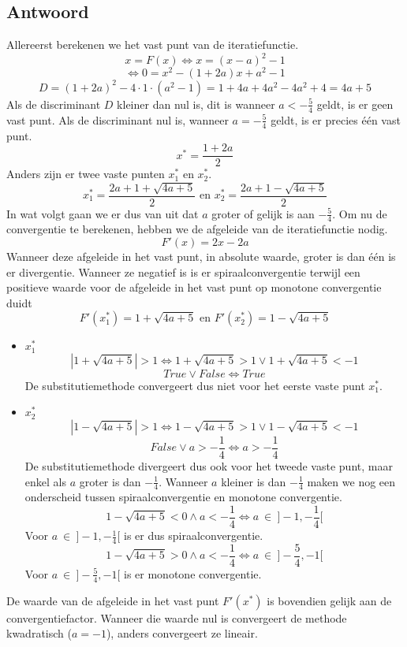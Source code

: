 \documentclass[examenvragen.tex]{subfiles}
\begin{document}
\subsection{Antwoord}
Allereerst berekenen we het vast punt van de iteratiefunctie.
\[
x = F(x) \Leftrightarrow x = (x-a)^2-1
\]
\[
\Leftrightarrow 0 = x^2-(1+2a)x+a^2-1
\]
\[
D = (1+2a)^2 - 4\cdot1\cdot(a^2-1) = 1+4a+4a^2-4a^2+4 = 4a+5
\]
Als de discriminant $D$ kleiner dan nul is, dit is wanneer $a < - \frac{5}{4}$ geldt, is er geen vast punt. Als de discriminant nul is, wanneer $a=-\frac{5}{4}$ geldt, is er precies \'e\'en vast punt. 
\[
x^{*} = \frac{1+2a}{2}
\]
Anders zijn er twee vaste punten $x^{*}_{1}$ en $x^{*}_{2}$.
\[
x^{*}_1 = \frac{2a+1 +\sqrt{4a+5}}{2} \text{ en } x^{*}_{2}= \frac{2a+1 -\sqrt{4a+5}}{2}
\]
In wat volgt gaan we er dus van uit dat $a$ groter of gelijk is aan $-\frac{5}{4}$.
Om nu de convergentie te berekenen, hebben we de afgeleide van de iteratiefunctie nodig.
\[
F'(x) = 2x-2a
\]
Wanneer deze afgeleide in het vast punt, in absolute waarde, groter is dan \'e\'en is er divergentie. Wanneer ze negatief is is er spiraalconvergentie terwijl een positieve waarde voor de afgeleide in het vast punt op monotone convergentie duidt
\[
F'(x^{*}_1) = 1 +  \sqrt{4a+5} \text{ en } F'(x^{*}_2) = 1-\sqrt{4a+5}
\]
\begin{itemize}
\item $x_{1}^{*}$
\[
|1 + \sqrt{4a+5}| > 1 \Leftrightarrow 1 + \sqrt{4a+5} > 1 \vee  1 + \sqrt{4a+5} < -1
\]
\[
True \vee False \Leftrightarrow True
\]
De substitutiemethode convergeert dus niet voor het eerste vaste punt $x_1^{*}$.
\item $x_{2}^{*}$
\[
|1-\sqrt{4a+5}| > 1 \Leftrightarrow  1-\sqrt{4a+5} > 1 \vee 1-\sqrt{4a+5} <-1
\]
\[
False \vee a > -\frac{1}{4} \Leftrightarrow a > -\frac{1}{4}
\]
De substitutiemethode divergeert dus ook voor het tweede vaste punt, maar enkel als $a$ groter is dan $-\frac{1}{4}$.
Wanneer $a$ kleiner is dan $-\frac{1}{4}$ maken we nog een onderscheid tussen spiraalconvergentie en monotone convergentie.
\[
1-\sqrt{4a+5} < 0 \wedge a < -\frac{1}{4} \Leftrightarrow a\ \in\  ]-1,-\frac{1}{4}[
\]
Voor $a\ \in\  ]-1,-\frac{1}{4}[$ is er dus spiraalconvergentie.
\[
1-\sqrt{4a+5} > 0 \wedge a < -\frac{1}{4} \Leftrightarrow a\ \in\ ]-\frac{5}{4},-1[
\]
Voor $a\ \in\ ]-\frac{5}{4},-1[$ is er monotone convergentie.
\end{itemize}
De waarde van de afgeleide in het vast punt $F'(x^*)$ is bovendien gelijk aan de convergentiefactor. Wanneer die waarde nul is convergeert de methode kwadratisch ($a = -1$), anders convergeert ze lineair.
\end{document}
